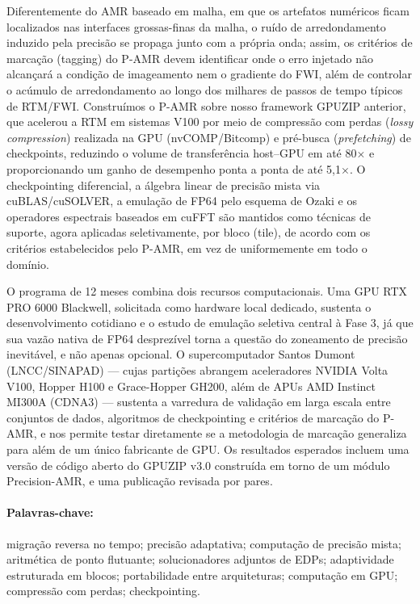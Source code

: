 \documentclass[12pt,a4paper]{article}
\newcommand{\pamr}{P\nobreakdash-AMR}
\begin{document}
Diferentemente do AMR baseado em malha, em que os artefatos numéricos ficam
localizados nas interfaces grossas-finas da malha, o ruído de arredondamento
induzido pela precisão se propaga junto com a própria onda; assim, os
critérios de marcação (tagging) do \pamr{} devem identificar onde o erro
injetado não alcançará a condição de imageamento nem o gradiente do FWI, além
de controlar o acúmulo de arredondamento ao longo dos milhares de passos de
tempo típicos de RTM/FWI. Construímos o \pamr{} sobre nosso framework GPUZIP
anterior, que acelerou a RTM em sistemas V100 por meio de compressão com
perdas (\emph{lossy compression}) realizada na GPU (nvCOMP/Bitcomp) e
pré-busca (\emph{prefetching}) de checkpoints, reduzindo o volume de
transferência host--GPU em até 80$\times$ e proporcionando um ganho de
desempenho ponta a ponta de até 5,1$\times$. O checkpointing diferencial, a
álgebra linear de precisão mista via cuBLAS/cuSOLVER, a emulação de FP64 pelo
esquema de Ozaki e os operadores espectrais baseados em cuFFT são mantidos
como técnicas de suporte, agora aplicadas seletivamente, por bloco (tile), de
acordo com os critérios estabelecidos pelo \pamr{}, em vez de uniformemente em
todo o domínio.

O programa de 12 meses combina dois recursos computacionais. Uma GPU RTX PRO
6000 Blackwell, solicitada como hardware local dedicado, sustenta o
desenvolvimento cotidiano e o estudo de emulação seletiva central à Fase 3,
já que sua vazão nativa de FP64 desprezível torna a questão do zoneamento de
precisão inevitável, e não apenas opcional. O supercomputador Santos Dumont
(LNCC/SINAPAD) --- cujas partições abrangem aceleradores NVIDIA Volta V100,
Hopper H100 e Grace-Hopper GH200, além de APUs AMD Instinct MI300A (CDNA3)
--- sustenta a varredura de validação em larga escala entre conjuntos de
dados, algoritmos de checkpointing e critérios de marcação do \pamr{}, e nos
permite testar diretamente se a metodologia de marcação generaliza para além
de um único fabricante de GPU. Os resultados esperados incluem uma versão de
código aberto do GPUZIP v3.0 construída em torno de um módulo Precision-AMR, e
uma publicação revisada por pares.

\paragraph{Palavras-chave:} migração reversa no tempo; precisão adaptativa;
computação de precisão mista; aritmética de ponto flutuante; solucionadores
adjuntos de EDPs; adaptividade estruturada em blocos; portabilidade entre
arquiteturas; computação em GPU; compressão com perdas; checkpointing.
\end{document}
